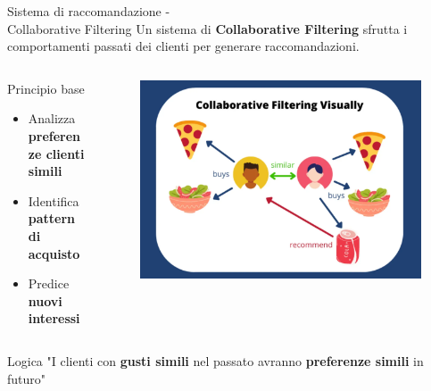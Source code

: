 \documentclass{beamer}
\begin{document}
	\begin{frame}{Sistema di raccomandazione -\\ Collaborative Filtering}
		Un sistema di \textbf{Collaborative Filtering} sfrutta i comportamenti passati dei clienti per generare raccomandazioni.

		\begin{columns}
			\begin{column}{0.6\textwidth}
				\begin{block}{Principio base}
					\begin{itemize}
						\item Analizza \textbf{preferenze clienti simili}
						\item Identifica \textbf{pattern di acquisto}
						\item Predice \textbf{nuovi interessi}
					\end{itemize}
				\end{block}
			\end{column}
			\begin{column}{0.38\textwidth}
				\begin{figure}
					\centering
					\includegraphics[width=\textwidth]{Collaborative-Filtering.png}
				\end{figure}
			\end{column}
		\end{columns}

		\begin{alertblock}{Logica}
			"I clienti con \textbf{gusti simili} nel passato avranno \textbf{preferenze simili} in futuro"
		\end{alertblock}
	\end{frame}
\end{document}
